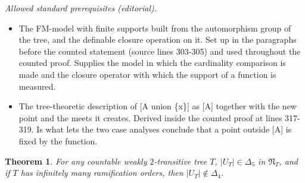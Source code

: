 \documentclass[10pt,a4paper]{amsart}
\newtheorem{theorem}{Theorem}[section]
\begin{document}
\noindent\textit{Allowed standard prerequisites (editorial).}\begin{itemize}
\item The FM-model with finite supports built from the automorphism group of the tree, and the definable closure operation on it. Set up in the paragraphs before the counted statement (source lines 303-305) and used throughout the counted proof. Supplies the model in which the cardinality comparison is made and the closure operator with which the support of a function is measured.
\item The tree-theoretic description of [A union \{x\}] as [A] together with the new point and the meets it creates. Derived inside the counted proof at lines 317-319. Is what lets the two case analyses conclude that a point outside [A] is fixed by the function.
\end{itemize}\medskip
\begin{theorem}  \label{3.1} For any countable weakly $2$-transitive tree $T$, $|U_T| \in \Delta_5$ in ${\mathfrak N}_T$, 
and if $T$ has infinitely many ramification orders, then $|U_T| \not \in \Delta_4$.   \end{theorem}
\end{document}
